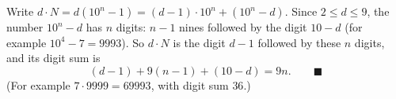 Write $d\cdot N=d\left(10^n-1\right)=(d-1)\cdot10^n+\left(10^n-d\right)$. Since $2\le d\le9$, the number $10^n-d$ has $n$ digits: $n-1$ nines followed by the digit $10-d$ (for example $10^4-7=9993$). So $d\cdot N$ is the digit $d-1$ followed by these $n$ digits, and its digit sum is
\[(d-1)+9(n-1)+(10-d)=9n.\qquad\blacksquare\]
(For example $7\cdot9999=69993$, with digit sum $36$.)
